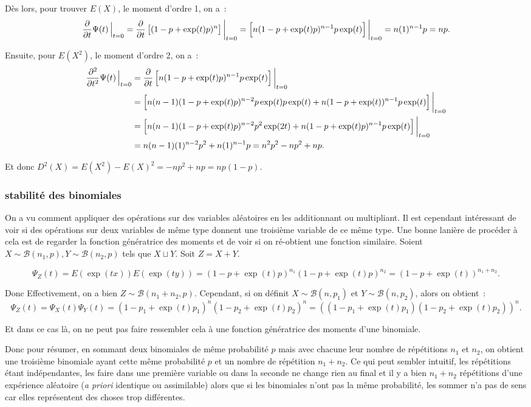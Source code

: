\documentclass{article}
\renewcommand{\pd}[1]{\frac {\partial}{\partial #1}}
\begin{document}
			Dès lors, pour trouver $E(X)$, le moment d'ordre 1, on a~:
			\[\pd t\Psi(t)\sVert[2]_{t=0} = \pd t\left[(1-p+\exp(t)p)^n\right]\sVert[3]_{t=0} = \left[n(1-p+\exp(t)p)^{n-1}p\exp(t)\right]\sVert[3]_{t=0}
				= n(1)^{n-1}p = np.\]

			Ensuite, pour $E(X^2)$, le moment d'ordre 2, on a~:
			\begin{align*}
				\frac {\partial^2}{\partial t^2}\Psi(t)\sVert[2]_{t=0} &= \pd t\left[n(1-p+\exp(t)p)^{n-1}p\exp(t)\right]\sVert[3]_{t=0} \\
				&= \left[n(n-1)(1-p+\exp(t)p)^{n-2}p\exp(t)p\exp(t) + n(1-p+\exp(t))^{n-1}p\exp(t)\right]\sVert[3]_{t=0} \\
				&= \left[n(n-1)(1-p+\exp(t)p)^{n-2}p^2\exp(2t) + n(1-p+\exp(t)p)^{n-1}p\exp(t)\right]\sVert[3]_{t=0} \\
				&= n(n-1)(1)^{n-2}p^2 + n(1)^{n-1}p = n^2p^2 - np^2 + np.
			\end{align*}

			Et donc $D^2(X) = E(X^2) - E(X)^2 = -np^2 + np = np(1-p)$.

		\subsubsection{stabilité des binomiales}
			On a vu comment appliquer des opérations sur des variables aléatoires en les additionnant ou multipliant. Il est cependant intéressant de voir si des
			opérations sur deux variables de même type donnent une troisième variable de ce même type. Une bonne lanière de procéder à cela est de regarder la fonction
			génératrice des moments et de voir si on ré-obtient une fonction similaire. Soient $X \sim \mathcal B(n_1, p), Y \sim \mathcal B(n_2, p)$ tels que
			$X \sqcup Y$. Soit $Z = X + Y$.

			\[\Psi_Z(t) = E(\exp(tx))E(\exp(ty)) = (1-p+\exp(t)p)^{n_1}(1-p+\exp(t)p)^{n_2} = (1-p+\exp(t))^{n_1+n_2}.\]

			Donc Effectivement, on a bien $Z \sim \mathcal B(n_1+n_2, p)$. Cependant, si on définit $X \sim \mathcal B(n, p_1)$ et $Y \sim \mathcal B(n, p_2)$, alors on
			obtient~:
			\[\Psi_Z(t) = \Psi_X(t)\Psi_Y(t) = (1-p_1+\exp(t)p_1)^n(1-p_2+\exp(t)p_2)^n = ((1-p_1+\exp(t)p_1)(1-p_2+\exp(t)p_2))^n.\]

			Et dans ce cas là, on ne peut pas faire ressembler cela à une fonction génératrice des moments d'une binomiale.

			Donc pour résumer, en sommant deux binomiales de même probabilité $p$ mais avec chacune leur nombre de répétitions $n_1$ et $n_2$, on obtient une troisième
			binomiale ayant cette même probabilité $p$ et un nombre de répétition $n_1+n_2$. Ce qui peut sembler intuitif, les répétitions étant indépendantes, les faire
			dans une première variable ou dans la seconde ne change rien au final et il y a bien $n_1+n_2$ répétitions d'une expérience aléatoire (\textit{a priori}
			identique ou assimilable) alors que si les binomiales n'ont pas la même probabilité, les sommer n'a pas de sens car elles représentent des choses trop
			différentes.
\end{document}
